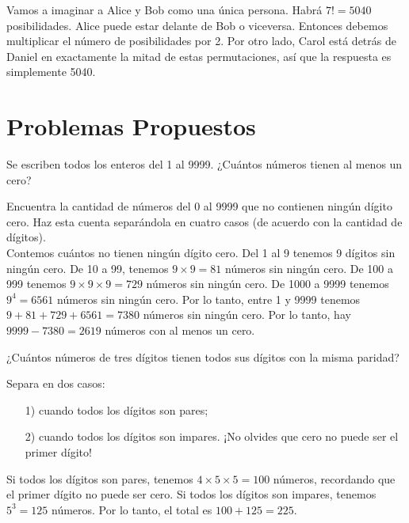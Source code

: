 \documentclass[11pt]{scrartcl}
\begin{document}
Vamos a imaginar a Alice y Bob como una única persona. Habrá $7! = 5040$ posibilidades. Alice puede estar delante de Bob o viceversa. Entonces debemos multiplicar el número de posibilidades por 2. Por otro lado, Carol está detrás de Daniel en exactamente la mitad de estas permutaciones, así que la respuesta es simplemente 5040.


\section{Problemas Propuestos}
\begin{problem}
Se escriben todos los enteros del 1 al 9999. ¿Cuántos números tienen al menos un cero?
\begin{hint}
Encuentra la cantidad de números del 0 al 9999 que no contienen ningún dígito cero. Haz esta cuenta separándola en cuatro casos (de acuerdo con la cantidad de dígitos).\\

Contemos cuántos no tienen ningún dígito cero. Del 1 al 9 tenemos 9 dígitos sin ningún cero. De 10 a 99, tenemos $9 \times 9 = 81$ números sin ningún cero. De 100 a 999 tenemos $9 \times 9 \times 9 = 729$ números sin ningún cero. De 1000 a 9999 tenemos $9^4 = 6561$ números sin ningún cero. Por lo tanto, entre 1 y 9999 tenemos $9 + 81 + 729 + 6561 = 7380$ números sin ningún cero. Por lo tanto, hay $9999 - 7380 = 2619$ números con al menos un cero.
\end{hint}
\end{problem}

\begin{problem}
¿Cuántos números de tres dígitos tienen todos sus dígitos con la misma paridad?
\begin{hint}
Separa en dos casos:\begin{itemize}
\item[1)] cuando todos los dígitos son pares;
\item[2)] cuando todos los dígitos son impares. ¡No olvides que cero no puede ser el primer dígito!
\end{itemize}

Si todos los dígitos son pares, tenemos $4 \times 5 \times 5 = 100$ números, recordando que el primer dígito no puede ser cero. Si todos los dígitos son impares, tenemos $5^3 = 125$ números. Por lo tanto, el total es $100 + 125 = 225$.

\end{hint}
\end{problem}
\end{document}
